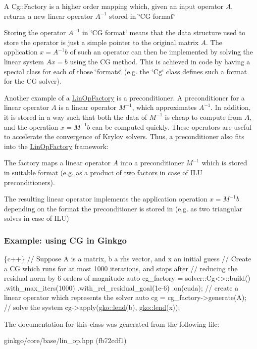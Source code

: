 \begin{DoxyItemize}
\item A Cg\+::\+Factory is a higher order mapping which, given an input operator $A$, returns a new linear operator $A^{-1}$ stored in \char`\"{}\+C\+G
    format\char`\"{}
\item Storing the operator $A^{-1}$ in \char`\"{}\+C\+G format\char`\"{} means that the data structure used to store the operator is just a simple pointer to the original matrix $A$. The application $x = A^{-1}b$ of such an operator can then be implemented by solving the linear system $Ax = b$ using the CG method. This is achieved in code by having a special class for each of those \char`\"{}formats\char`\"{} (e.\+g. the \char`\"{}\+Cg\char`\"{} class defines such a format for the CG solver).
\end{DoxyItemize}

Another example of a \hyperlink{classgko_1_1LinOpFactory}{Lin\+Op\+Factory} is a preconditioner. A preconditioner for a linear operator $A$ is a linear operator $M^{-1}$, which approximates $A^{-1}$. In addition, it is stored in a way such that both the data of $M^{-1}$ is cheap to compute from $A$, and the operation $x = M^{-1}b$ can be computed quickly. These operators are useful to accelerate the convergence of Krylov solvers. Thus, a preconditioner also fits into the \hyperlink{classgko_1_1LinOpFactory}{Lin\+Op\+Factory} framework\+:


\begin{DoxyItemize}
\item The factory maps a linear operator $A$ into a preconditioner $M^{-1}$ which is stored in suitable format (e.\+g. as a product of two factors in case of I\+LU preconditioners).
\item The resulting linear operator implements the application operation $x = M^{-1}b$ depending on the format the preconditioner is stored in (e.\+g. as two triangular solves in case of I\+LU)
\end{DoxyItemize}

\subsubsection*{Example\+: using CG in Ginkgo }


\begin{DoxyCode}
\{c++\}
\textcolor{comment}{// Suppose A is a matrix, b a rhs vector, and x an initial guess}
\textcolor{comment}{// Create a CG which runs for at most 1000 iterations, and stops after}
\textcolor{comment}{// reducing the residual norm by 6 orders of magnitude}
\textcolor{keyword}{auto} cg\_factory = solver::Cg<>::build()
    .with\_max\_iters(1000)
    .with\_rel\_residual\_goal(1e-6)
    .on(cuda);
\textcolor{comment}{// create a linear operator which represents the solver}
\textcolor{keyword}{auto} cg = cg\_factory->generate(A);
\textcolor{comment}{// solve the system}
cg->apply(\hyperlink{namespacegko_aa8cb4876b72e5e1036ea9575443c439b}{gko::lend}(b), \hyperlink{namespacegko_aa8cb4876b72e5e1036ea9575443c439b}{gko::lend}(x));
\end{DoxyCode}
 

The documentation for this class was generated from the following file\+:\begin{DoxyCompactItemize}
\item 
ginkgo/core/base/lin\+\_\+op.\+hpp (fb72cdf1)\end{DoxyCompactItemize}
